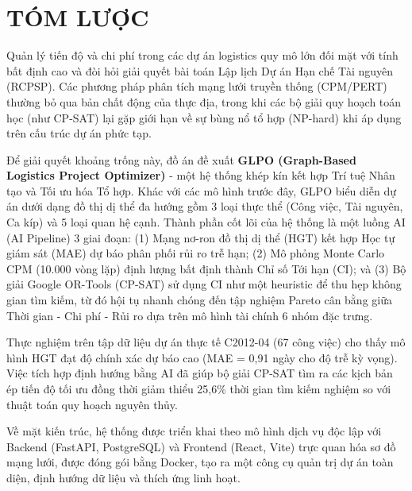 \chapter*{TÓM LƯỢC}

Quản lý tiến độ và chi phí trong các dự án logistics quy mô lớn đối mặt với tính bất định cao và đòi hỏi giải quyết bài toán Lập lịch Dự án Hạn chế Tài nguyên (RCPSP). Các phương pháp phân tích mạng lưới truyền thống (CPM/PERT) thường bỏ qua bản chất động của thực địa, trong khi các bộ giải quy hoạch toán học (như CP-SAT) lại gặp giới hạn về sự bùng nổ tổ hợp (NP-hard) khi áp dụng trên cấu trúc dự án phức tạp.

Để giải quyết khoảng trống này, đồ án đề xuất \textbf{GLPO (Graph-Based Logistics Project Optimizer)} - một hệ thống khép kín kết hợp Trí tuệ Nhân tạo và Tối ưu hóa Tổ hợp. Khác với các mô hình trước đây, GLPO biểu diễn dự án dưới dạng đồ thị dị thể đa hướng gồm 3 loại thực thể (Công việc, Tài nguyên, Ca kíp) và 5 loại quan hệ cạnh. Thành phần cốt lõi của hệ thống là một luồng AI (AI Pipeline) 3 giai đoạn: (1) Mạng nơ-ron đồ thị dị thể (HGT) kết hợp Học tự giám sát (MAE) dự báo phân phối rủi ro trễ hạn; (2) Mô phỏng Monte Carlo CPM (10.000 vòng lặp) định lượng bất định thành Chỉ số Tới hạn (CI); và (3) Bộ giải Google OR-Tools (CP-SAT) sử dụng CI như một heuristic để thu hẹp không gian tìm kiếm, từ đó hội tụ nhanh chóng đến tập nghiệm Pareto cân bằng giữa Thời gian - Chi phí - Rủi ro dựa trên mô hình tài chính 6 nhóm đặc trưng.

Thực nghiệm trên tập dữ liệu dự án thực tế C2012-04 (67 công việc) cho thấy mô hình HGT đạt độ chính xác dự báo cao (MAE = 0,91 ngày cho độ trễ kỳ vọng). Việc tích hợp định hướng bằng AI đã giúp bộ giải CP-SAT tìm ra các kịch bản ép tiến độ tối ưu đồng thời giảm thiểu 25,6\% thời gian tìm kiếm nghiệm so với thuật toán quy hoạch nguyên thủy. 

Về mặt kiến trúc, hệ thống được triển khai theo mô hình dịch vụ độc lập với Backend (FastAPI, PostgreSQL) và Frontend (React, Vite) trực quan hóa sơ đồ mạng lưới, được đóng gói bằng Docker, tạo ra một công cụ quản trị dự án toàn diện, định hướng dữ liệu và thích ứng linh hoạt.